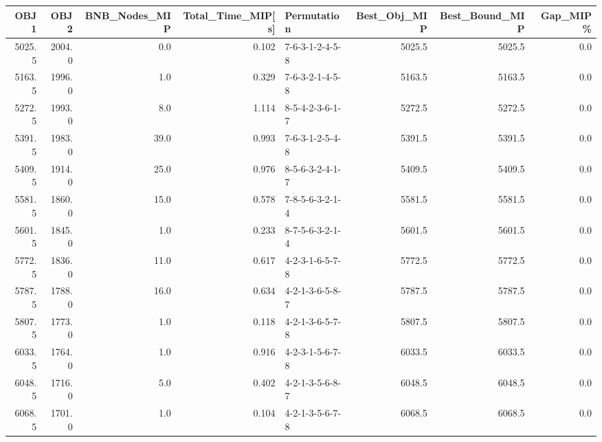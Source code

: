 \begin{tabular}{rrrrlrrr}
\toprule
   OBJ1 &    OBJ2 &  BNB\_Nodes\_MIP &  Total\_Time\_MIP[s] &      Permutation &  Best\_Obj\_MIP &  Best\_Bound\_MIP &  Gap\_MIP\% \\
\midrule
 5025.5 &  2004.0 &            0.0 &              0.102 &  7-6-3-1-2-4-5-8 &        5025.5 &          5025.5 &       0.0 \\
 5163.5 &  1996.0 &            1.0 &              0.329 &  7-6-3-2-1-4-5-8 &        5163.5 &          5163.5 &       0.0 \\
 5272.5 &  1993.0 &            8.0 &              1.114 &  8-5-4-2-3-6-1-7 &        5272.5 &          5272.5 &       0.0 \\
 5391.5 &  1983.0 &           39.0 &              0.993 &  7-6-3-1-2-5-4-8 &        5391.5 &          5391.5 &       0.0 \\
 5409.5 &  1914.0 &           25.0 &              0.976 &  8-5-6-3-2-4-1-7 &        5409.5 &          5409.5 &       0.0 \\
 5581.5 &  1860.0 &           15.0 &              0.578 &  7-8-5-6-3-2-1-4 &        5581.5 &          5581.5 &       0.0 \\
 5601.5 &  1845.0 &            1.0 &              0.233 &  8-7-5-6-3-2-1-4 &        5601.5 &          5601.5 &       0.0 \\
 5772.5 &  1836.0 &           11.0 &              0.617 &  4-2-3-1-6-5-7-8 &        5772.5 &          5772.5 &       0.0 \\
 5787.5 &  1788.0 &           16.0 &              0.634 &  4-2-1-3-6-5-8-7 &        5787.5 &          5787.5 &       0.0 \\
 5807.5 &  1773.0 &            1.0 &              0.118 &  4-2-1-3-6-5-7-8 &        5807.5 &          5807.5 &       0.0 \\
 6033.5 &  1764.0 &            1.0 &              0.916 &  4-2-3-1-5-6-7-8 &        6033.5 &          6033.5 &       0.0 \\
 6048.5 &  1716.0 &            5.0 &              0.402 &  4-2-1-3-5-6-8-7 &        6048.5 &          6048.5 &       0.0 \\
 6068.5 &  1701.0 &            1.0 &              0.104 &  4-2-1-3-5-6-7-8 &        6068.5 &          6068.5 &       0.0 \\
\bottomrule
\end{tabular}
